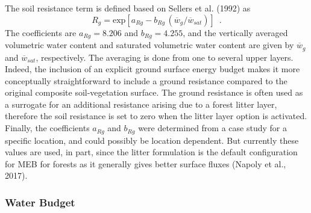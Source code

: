 The soil resistance term is
defined based on 
Sellers et al. (1992)\nocite{sellers_ea_1992} 
as
%
\begin{equation}
\label{eq:meb_resis_grnd}
R_g = {\mathrm{exp}}\left[a_{Rg} - b_{Rg} \,
\left({\overline w_g}/{\overline w_{sat}}\right)\right] \,\,\,.
%
\end{equation}
%
The coefficients are $a_{Rg}=8.206$ and $b_{Rg}=4.255$, and the
vertically averaged volumetric water content and saturated volumetric water content 
are given by ${\overline w_g}$ and ${\overline w_{sat}}$,
respectively. The averaging is done from one to several upper layers.
%
Indeed, the inclusion of an explicit ground surface energy budget
makes it more conceptually straightforward to include a ground
resistance compared to the original composite soil-vegetation
surface.
%
The ground resistance is often used as a surrogate for an additional
resistance arising due to a forest litter layer, therefore
the soil resistance is set to zero 
when the litter layer option is activated. 
Finally, the coefficients $a_{Rg}$ and $b_{Rg}$ were determined from a case study for a
specific location, and could possibly be location dependent. But
currently these values are used, in part, since the
litter formulation is the default
configuration for MEB for forests as it generally gives better surface
fluxes 
(Napoly et al., 2017)\nocite{napoly_ea_2017}.









\subsubsection{Water Budget}
\label{sec:meb_water_budget}

